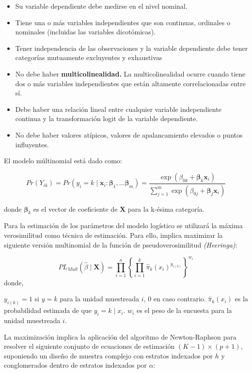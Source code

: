 \documentclass[
  12pt,
]{book}
\begin{document}
\begin{itemize}
\item
  Su variable dependiente debe medirse en el nivel nominal.
\item
  Tiene una o más variables independientes que son continuas, ordinales o nominales (incluidas las variables dicotómicas).
\item
  Tener independencia de las observaciones y la variable dependiente debe tener categorías mutuamente excluyentes y exhaustivas
\item
  No debe haber \textbf{multicolinealidad.} La multicolinealidad ocurre cuando tiene dos o más variables independientes que están altamente correlacionadas entre sí.
\item
  Debe haber una relación lineal entre cualquier variable independiente continua y la transformación logit de la variable dependiente.
\item
  No debe haber valores atípicos, valores de apalancamiento elevados o puntos influyentes.
\end{itemize}

El modelo múltinomial está dado como:

\[
Pr\left(Y_{ik}\right)=Pr\left(y_{i}=k\mid\boldsymbol{x}_{i}:\boldsymbol{\beta}_{1},\dots\boldsymbol{\beta}_{m}\right)=\frac{\exp\left(\beta_{0k}+\boldsymbol{\beta}_{k}\boldsymbol{x}_{i}\right)}{\sum_{j=1}^{m}\exp\left(\beta_{0j}+\boldsymbol{\beta}_{j}\boldsymbol{x}_{i}\right)}
\]

donde \(\boldsymbol{\beta}_k\) es el vector de coeficiente de \(\boldsymbol{X}\) para la k-ésima categoría.

Para la estimación de los parámetros del modelo logístico se utilizará la máxima verosimilitud como técnica de estimación. Para ello, implica maximizar la siguiente versión multinomial de la función de pseudoverosimilitud \emph{(Heeringa)}:

\[
PL_{Mult}\left(\hat{\beta}\mid\boldsymbol{X}\right)  =  \prod_{i=1}^{n}\left\{ \prod_{i=1}^{k}\hat{\pi}_{k}\left(x_{i}\right)^{y_{i\left(k\right)}}\right\} ^{w_{i}}
\]
donde,

\(y_{i\left(k\right)}=1\) si \(y = k\) para la unidad muestreada \(i\), 0 en caso contrario. \(\hat{\pi}_{k}\left(x_{i}\right)\) es la probabilidad estimada de que \(y_{i}=k\mid x_{i}\). \(w_{i}\) es el peso de la encuesta para la unidad muestreada \(i\).

La maximización implica la aplicación del algoritmo de Newton-Raphson para resolver el siguiente conjunto de ecuaciones de estimación \(\left(K-1\right)\times\left(p+1\right)\),
suponiendo un diseño de muestra complejo con estratos indexados por \(h\) y conglomerados dentro de estratos indexados por \(\alpha\):
\end{document}
